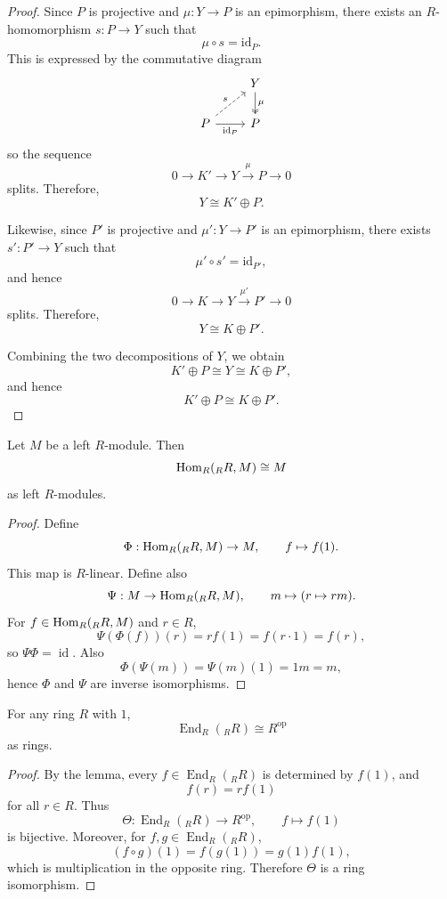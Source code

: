 \begin{proof}
    Since $P$ is projective and $\mu:Y\to P$ is an epimorphism, there exists
    an $R$-homomorphism $s:P\to Y$ such that
    \[
        \mu\circ s=\mathrm{id}_P.
    \]
    This is expressed by the commutative diagram
    \[
        \begin{tikzcd}
            & Y \arrow[d, two heads, "\mu"] \\
            P \arrow[ur, dashed, "s"] \arrow[r, "\mathrm{id}_P"']
            & P
        \end{tikzcd}
    \]
    so the sequence
    \[
        0\longrightarrow K' \longrightarrow Y \xrightarrow{\,\mu\,} P \longrightarrow 0
    \]
    splits. Therefore,
    \[
        Y\cong K'\oplus P.
    \]

    Likewise, since $P'$ is projective and $\mu':Y\to P'$ is an epimorphism, there exists $s':P'\to Y$ such that
    \[
        \mu'\circ s'=\mathrm{id}_{P'},
    \]
    and hence
    \[
        0\longrightarrow K \longrightarrow Y \xrightarrow{\,\mu'\,} P' \longrightarrow 0
    \]
    splits. Therefore,
    \[
        Y\cong K\oplus P'.
    \]

    Combining the two decompositions of $Y$, we obtain
    \[
        K'\oplus P \cong Y \cong K\oplus P',
    \]
    and hence
    \[
        K'\oplus P \cong K\oplus P'.
    \]
\end{proof}



\begin{lemma}
    Let $M$ be a left $R$-module. Then
    \[
        \mathrm{Hom}_R({}_R R,M)\cong M
    \]
    as left $R$-modules.
\end{lemma}

\begin{proof}
    Define
    \[
        \Phi:\mathrm{Hom}_R({}_R R,M)\to M,\qquad f\mapsto f(1).
    \]
    This map is $R$-linear. Define also
    \[
        \Psi:M\to \mathrm{Hom}_R({}_R R,M),\qquad m\mapsto (r\mapsto rm).
    \]
    For $f\in \mathrm{Hom}_R({}_R R,M)$ and $r\in R$,
    \[
        \Psi(\Phi(f))(r)=r f(1)=f(r\cdot 1)=f(r),
    \]
    so $\Psi\Phi=\operatorname{id}$. Also
    \[
        \Phi(\Psi(m))=\Psi(m)(1)=1m=m,
    \]
    hence $\Phi$ and $\Psi$ are inverse isomorphisms.
\end{proof}

\begin{corollary}
    For any ring $R$ with $1$,
    \[
        \operatorname{End}_R({}_R R)\cong R^{\operatorname{op}}
    \]
    as rings.
\end{corollary}

\begin{proof}
    By the lemma, every $f\in \operatorname{End}_R({}_R R)$ is determined by $f(1)$, and
    \[
        f(r)=rf(1)
    \]
    for all $r\in R$. Thus
    \[
        \Theta:\operatorname{End}_R({}_R R)\to R^{\operatorname{op}},\qquad f\mapsto f(1)
    \]
    is bijective. Moreover, for $f,g\in \operatorname{End}_R({}_R R)$,
    \[
        (f\circ g)(1)=f(g(1))=g(1)f(1),
    \]
    which is multiplication in the opposite ring. Therefore $\Theta$ is a ring isomorphism.
\end{proof}

